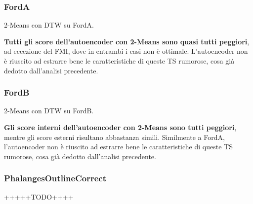 \subsubsection{FordA}
\begin{center}
	\begin{table}[H]
		\centering
		\caption{2-Means con DTW su FordA.}
	\end{table}
\end{center}
\textbf{Tutti gli score dell'autoencoder con 2-Means sono quasi tutti peggiori}, ad eccezione del FMI, dove in entrambi i casi non è ottimale. L'autoencoder non è riuscito ad estrarre bene le caratteristiche di queste TS rumorose, cosa già dedotto dall'analisi precedente. 

\subsubsection{FordB}
\begin{center}
	\begin{table}[H]
		\centering
		\caption{2-Means con DTW su FordB.}
	\end{table}
\end{center}
\textbf{Gli score interni dell'autoencoder con 2-Means sono tutti peggiori}, mentre gli score esterni risultano abbastanza simili. Similmente a FordA, l'autoencoder non è riuscito ad estrarre bene le caratteristiche di queste TS rumorose, cosa già dedotto dall'analisi precedente. 

\subsubsection{PhalangesOutlineCorrect}
+++++TODO++++


